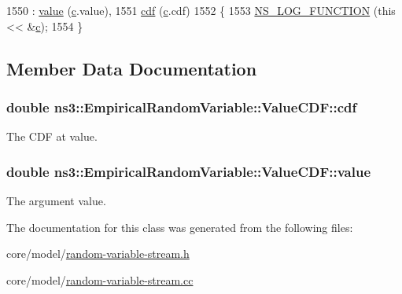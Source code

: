 \begin{DoxyCode}
1550   : \hyperlink{classns3_1_1EmpiricalRandomVariable_1_1ValueCDF_a6fea6513323d037d3d34aac55f5f215c}{value} (\hyperlink{lte_2model_2fading-traces_2fading__trace__generator_8m_ae0323a9039add2978bf5b49550572c7c}{c}.value),
1551     \hyperlink{classns3_1_1EmpiricalRandomVariable_1_1ValueCDF_a9d26b457d5352c60f5267d08d15c996a}{cdf} (\hyperlink{lte_2model_2fading-traces_2fading__trace__generator_8m_ae0323a9039add2978bf5b49550572c7c}{c}.cdf)
1552 \{
1553   \hyperlink{log-macros-disabled_8h_a90b90d5bad1f39cb1b64923ea94c0761}{NS\_LOG\_FUNCTION} (\textcolor{keyword}{this} << &\hyperlink{lte_2model_2fading-traces_2fading__trace__generator_8m_ae0323a9039add2978bf5b49550572c7c}{c});
1554 \}
\end{DoxyCode}


\subsection{Member Data Documentation}
\subsubsection[{\texorpdfstring{cdf}{cdf}}]{\setlength{\rightskip}{0pt plus 5cm}double ns3\+::\+Empirical\+Random\+Variable\+::\+Value\+C\+D\+F\+::cdf}\hypertarget{classns3_1_1EmpiricalRandomVariable_1_1ValueCDF_a9d26b457d5352c60f5267d08d15c996a}{}\label{classns3_1_1EmpiricalRandomVariable_1_1ValueCDF_a9d26b457d5352c60f5267d08d15c996a}
The C\+DF at {\ttfamily value}. 
\subsubsection[{\texorpdfstring{value}{value}}]{\setlength{\rightskip}{0pt plus 5cm}double ns3\+::\+Empirical\+Random\+Variable\+::\+Value\+C\+D\+F\+::value}\hypertarget{classns3_1_1EmpiricalRandomVariable_1_1ValueCDF_a6fea6513323d037d3d34aac55f5f215c}{}\label{classns3_1_1EmpiricalRandomVariable_1_1ValueCDF_a6fea6513323d037d3d34aac55f5f215c}
The argument value. 

The documentation for this class was generated from the following files\+:\begin{DoxyCompactItemize}
\item 
core/model/\hyperlink{random-variable-stream_8h}{random-\/variable-\/stream.\+h}\item 
core/model/\hyperlink{random-variable-stream_8cc}{random-\/variable-\/stream.\+cc}\end{DoxyCompactItemize}
